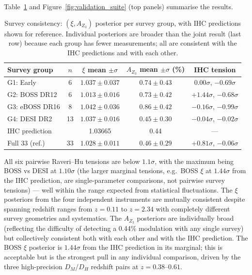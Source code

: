 \documentclass[12pt,a4paper]{article}
\begin{document}
Table~\ref{tab:survey_consistency} and Figure~\ref{fig:validation_suite} (top
panels) summarise the results.

\begin{table}[htbp]
\centering
\caption{Survey consistency: $(\xi, A_{Z_3})$ posterior per survey group,
with IHC predictions shown for reference.
Individual posteriors are broader than the joint result (last row) because each
group has fewer measurements; all are consistent with the IHC predictions and
with each other.}
\label{tab:survey_consistency}
\small
\begin{tabular}{lcccc}
\toprule
Survey group & $n$ & $\xi$ mean $\pm \sigma$ & $A_{Z_3}$ mean $\pm \sigma$ (\%) & IHC tension \\
\midrule
G1: Early          &  6 & $1.037 \pm 0.037$ & $0.74 \pm 0.43$ & $0.00\sigma$, $-0.69\sigma$ \\
G2: BOSS DR12      &  6 & $1.013 \pm 0.016$ & $0.73 \pm 0.42$ & $+1.44\sigma$, $-0.68\sigma$ \\
G3: eBOSS DR16     &  8 & $1.042 \pm 0.036$ & $0.86 \pm 0.42$ & $-0.16\sigma$, $-0.99\sigma$ \\
G4: DESI DR2       & 13 & $1.037 \pm 0.016$ & $0.45 \pm 0.30$ & $-0.04\sigma$, $-0.02\sigma$ \\
\midrule
IHC prediction     &    & 1.03665           & 0.44            & --- \\
Full 33 (ref.)     & 33 & $1.028 \pm 0.011$ & $0.46 \pm 0.29$ & $+0.81\sigma$, $-0.06\sigma$ \\
\bottomrule
\end{tabular}
\end{table}

All six pairwise Raveri--Hu tensions are below $1.1\sigma$, with the maximum being
BOSS vs DESI at $1.10\sigma$ (the larger marginal tensions, e.g.\ BOSS $\xi$ at
$1.44\sigma$ from the IHC prediction, are single-parameter comparisons, not
pairwise survey tensions) --- well within the range expected from
statistical fluctuations.  The $\xi$ posteriors from the four independent
instruments are mutually consistent despite spanning redshift ranges from
$z = 0.11$ to $z = 2.34$ with completely different survey geometries and
systematics.  The $A_{Z_3}$ posteriors are individually broad (reflecting the
difficulty of detecting a 0.44\% modulation with any single survey) but
collectively consistent both with each other and with the IHC prediction.
The BOSS $\xi$ posterior is $1.44\sigma$ from the IHC prediction in its marginal;
this is acceptable but is the strongest pull in any individual comparison, driven
by the three high-precision $D_M$/$D_H$ redshift pairs at $z = 0.38$--$0.61$.
\end{document}
